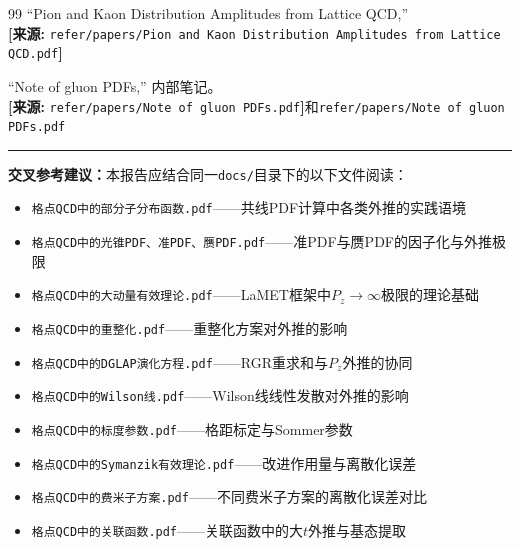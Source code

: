 \documentclass[12pt,a4paper]{ctexart}
\theoremstyle{definition}
\begin{document}
\begin{thebibliography}{99}
``Pion and Kaon Distribution Amplitudes from Lattice QCD,''
\\\textbf{[来源:} \texttt{refer/papers/Pion and Kaon Distribution Amplitudes from Lattice QCD.pdf}\textbf{]}

``Note of gluon PDFs,'' 内部笔记。
\\\textbf{[来源:} \texttt{refer/papers/Note of gluon PDFs.pdf}\textbf{]}和\texttt{refer/papers/Note of gluon PDFs.pdf}

\end{thebibliography}

\vspace{0.5cm}
\noindent\rule{\textwidth}{0.5pt}
\small
\textbf{交叉参考建议：}本报告应结合同一\texttt{docs/}目录下的以下文件阅读：
\begin{itemize}[nosep]
    \item \texttt{格点QCD中的部分子分布函数.pdf}——共线PDF计算中各类外推的实践语境
    \item \texttt{格点QCD中的光锥PDF、准PDF、赝PDF.pdf}——准PDF与赝PDF的因子化与外推极限
    \item \texttt{格点QCD中的大动量有效理论.pdf}——LaMET框架中$P_z\to\infty$极限的理论基础
    \item \texttt{格点QCD中的重整化.pdf}——重整化方案对外推的影响
    \item \texttt{格点QCD中的DGLAP演化方程.pdf}——RGR重求和与$P_z$外推的协同
    \item \texttt{格点QCD中的Wilson线.pdf}——Wilson线线性发散对外推的影响
    \item \texttt{格点QCD中的标度参数.pdf}——格距标定与Sommer参数
    \item \texttt{格点QCD中的Symanzik有效理论.pdf}——改进作用量与离散化误差
    \item \texttt{格点QCD中的费米子方案.pdf}——不同费米子方案的离散化误差对比
    \item \texttt{格点QCD中的关联函数.pdf}——关联函数中的大$t$外推与基态提取
\end{itemize}
\end{document}
